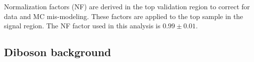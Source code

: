 %
%
%


Normalization factors (NF) are derived in the top validation region to correct for data and MC mis-modeling. These factors are applied to the top sample in the signal region. The NF factor used in this analysis is $0.99\pm0.01$. 

\subsection{Diboson background}

